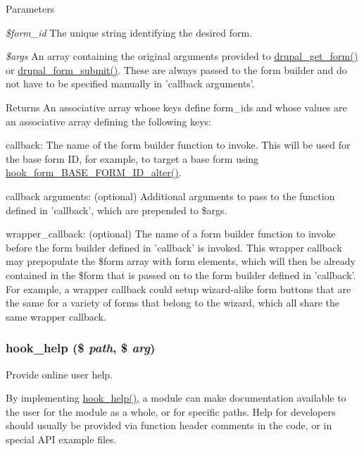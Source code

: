 \begin{DoxyParams}{Parameters}
\item[{\em \$form\_\-id}]The unique string identifying the desired form. \item[{\em \$args}]An array containing the original arguments provided to \hyperlink{group__form__api_ga720df81a837b06dfe19daf1c1eea3437}{drupal\_\-get\_\-form()} or \hyperlink{group__form__api_ga4312d7fe0602f6359153fc62cba1ca24}{drupal\_\-form\_\-submit()}. These are always passed to the form builder and do not have to be specified manually in 'callback arguments'.\end{DoxyParams}
\begin{DoxyReturn}{Returns}
An associative array whose keys define form\_\-ids and whose values are an associative array defining the following keys:
\begin{DoxyItemize}
\item callback: The name of the form builder function to invoke. This will be used for the base form ID, for example, to target a base form using \hyperlink{group__hooks_gaf0cfc224a88c8823da68856c30a4841a}{hook\_\-form\_\-BASE\_\-FORM\_\-ID\_\-alter()}.
\item callback arguments: (optional) Additional arguments to pass to the function defined in 'callback', which are prepended to \$args.
\item wrapper\_\-callback: (optional) The name of a form builder function to invoke before the form builder defined in 'callback' is invoked. This wrapper callback may prepopulate the \$form array with form elements, which will then be already contained in the \$form that is passed on to the form builder defined in 'callback'. For example, a wrapper callback could setup wizard-\/alike form buttons that are the same for a variety of forms that belong to the wizard, which all share the same wrapper callback. 
\end{DoxyItemize}
\end{DoxyReturn}
\hypertarget{group__hooks_ga5589c2714a782738e8851c4c90231f0e}{
\subsubsection[{hook\_\-help}]{\setlength{\rightskip}{0pt plus 5cm}hook\_\-help (\$ {\em path}, \/  \$ {\em arg})}}
\label{group__hooks_ga5589c2714a782738e8851c4c90231f0e}
Provide online user help.

By implementing \hyperlink{group__hooks_ga5589c2714a782738e8851c4c90231f0e}{hook\_\-help()}, a module can make documentation available to the user for the module as a whole, or for specific paths. Help for developers should usually be provided via function header comments in the code, or in special API example files.

